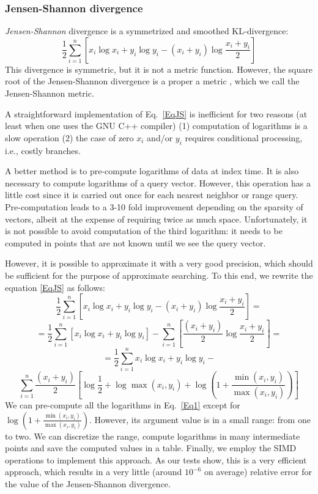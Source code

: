 \documentclass[runningheads,a4paper]{llncs}
\begin{document}
\subsubsection{Jensen-Shannon divergence}\label{SectionJS}
\emph{Jensen-Shannon} divergence is a symmetrized and smoothed KL-divergence:
\begin{equation}\label{EqJS}
\frac{1}{2}\sum_{i=1}^n\left[ x_i \log x_i + y_i \log y_i  -(x_i+y_i)\log \frac{x_i +y_i}{2}\right]
\end{equation}
This divergence is symmetric, but it is not a metric function.
However, the square root of the Jensen-Shannon divergence
is a proper a metric \cite{endres2003new},
which we call the Jensen-Shannon metric.

A straightforward implementation of Eq.~\ref{EqJS} is inefficient for two reasons 
(at least when one uses the GNU C++ compiler)
(1) computation of logarithms is a slow operation (2)
the case of zero $x_i$ and/or $y_i$ requires conditional processing, i.e.,
costly branches.

A better method is to pre-compute logarithms of data at index time. 
It is also necessary to compute logarithms of a query vector.
However, this operation has a little cost since it is carried out once 
for each nearest neighbor or range query.
Pre-computation leads to a 3-10 fold improvement depending on the sparsity of vectors,
albeit at the expense of requiring twice as much space.
Unfortunately, it is not possible to avoid computation of the third logarithm:
it needs to be computed in points that are not known until we see the query vector.

However, it is possible to approximate it with a very good precision,
which should be sufficient for the purpose of approximate searching.
To this end, we rewrite the equation \ref{EqJS} as follows:
$$
\frac{1}{2}\sum_{i=1}^n\left[ x_i \log x_i + y_i \log y_i  -(x_i+y_i)\log \frac{x_i +y_i}{2}\right]=
$$
$$
 = \frac{1}{2}\sum_{i=1}^n\left[ x_i \log x_i + y_i \log y_i\right]  -
\sum_{i=1}^n\left[\frac{(x_i+y_i)}{2}\log \frac{x_i +y_i}{2} \right]=
$$
$$
 = \frac{1}{2}\sum_{i=1}^n x_i \log x_i + y_i \log y_i  -
$$
\begin{equation}\label{Eq1}
\sum_{i=1}^n\frac{(x_i+y_i)}{2}\left[\log\frac{1}{2} + \log \max(x_i,y_i) + 
\log \left(1 + \frac{\min(x_i,y_i)}{\max(x_i,y_i)}\right) \right]
\end{equation}
We can pre-compute all the logarithms in Eq.~\ref{Eq1} except for $\log \left(1 + \frac{\min(x_i,y_i)}{\max(x_i,y_i)}\right) $. However, its argument value is in a small range: from one to two.
We can discretize the range, compute logarithms in many intermediate points and save the computed values in a table.
Finally, we employ the SIMD operations to implement this approach. 
As our tests show, this is a very efficient approach, which results in a very little (around $10^{-6}$ on average) relative error for the value of the Jensen-Shannon divergence.
\end{document}
